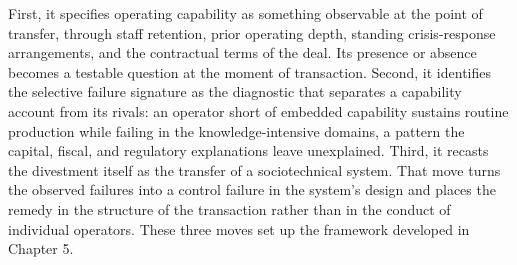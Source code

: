 First, it specifies operating capability as something observable at the
point of transfer, through staff retention, prior operating depth,
standing crisis-response arrangements, and the contractual terms of the
deal. Its presence or absence becomes a testable question at the moment
of transaction. Second, it identifies the selective failure signature as
the diagnostic that separates a capability account from its rivals: an
operator short of embedded capability sustains routine production while
failing in the knowledge-intensive domains, a pattern the capital,
fiscal, and regulatory explanations leave unexplained. Third, it recasts
the divestment itself as the transfer of a sociotechnical system. That
move turns the observed failures into a control failure in the system's
design and places the remedy in the structure of the transaction rather
than in the conduct of individual operators. These three moves set up
the framework developed in Chapter 5.
